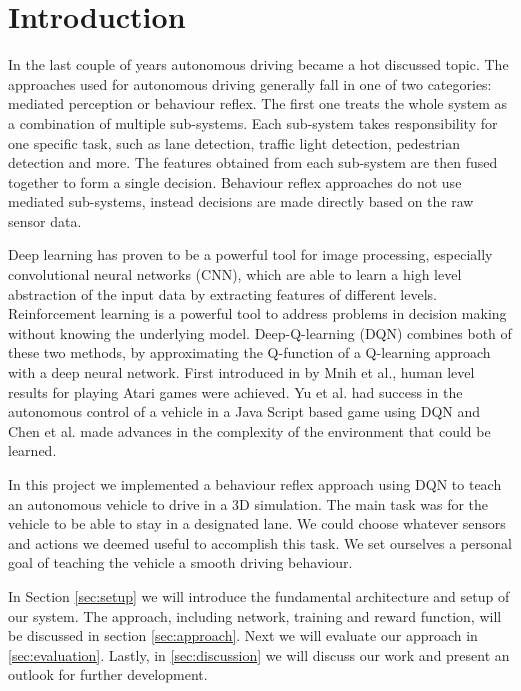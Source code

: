 
\section{Introduction}

In the last couple of years autonomous driving became a hot discussed topic. The approaches used for autonomous driving generally fall in one of two categories: mediated perception or behaviour reflex. The first one treats the whole system as a combination of multiple sub-systems. Each sub-system takes responsibility for one specific task, such as lane detection, traffic light detection, pedestrian detection and more. The features obtained from each sub-system are then fused together to form a single decision. Behaviour reflex approaches do not use mediated sub-systems, instead decisions are made directly based on the raw sensor data.

Deep learning has proven to be a powerful tool for image processing, especially convolutional neural networks (CNN), which are able to learn a high level abstraction of the input data by extracting features of different levels. Reinforcement learning is a powerful tool to address problems in decision making without knowing the underlying model. Deep-Q-learning (DQN) combines both of these two methods, by approximating the Q-function of a Q-learning approach with a deep neural network. First introduced in \cite{Mnih13} by Mnih et al., human level results for playing Atari games were achieved. Yu et al. \cite{yudeep} had success in the autonomous control of a vehicle in a Java Script based game using DQN and Chen et al. \cite{chen2015deepdriving} made advances in the complexity of the environment that could be learned. 

In this project we implemented a behaviour reflex approach using DQN to teach an autonomous vehicle to drive in a 3D simulation. The main task was for the vehicle to be able to stay in a designated lane. We could choose whatever sensors and actions we deemed useful to accomplish this task. We set ourselves a personal goal of teaching the vehicle a smooth driving behaviour.

In Section \ref{sec:setup} we will introduce the fundamental architecture and setup of our system. The approach, including network, training and reward function, will be discussed in section \ref{sec:approach}. Next we will evaluate our approach in \ref{sec:evaluation}. Lastly, in \ref{sec:discussion} we will discuss our work and present an outlook for further development.
